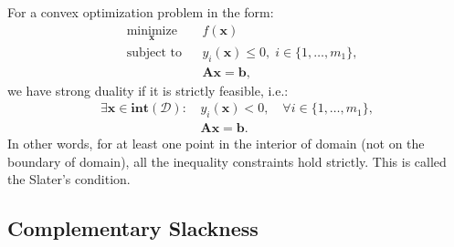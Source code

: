 \documentclass[lang=cn,10pt]{gorgeousnbook}
\numberwithin{equation}{section}%
\numberwithin{figure}{section}%
\begin{document}
\begin{lemma}
For a convex optimization problem in the form: 
\begin{equation}\label{equation_optimization_problem_inequalityConstraints_Ax_equals_b_constraint}
\begin{aligned}
& \underset{\boldsymbol{x}}{\text{minimize}}
& & f(\boldsymbol{x}) \\
& \text{subject to}
& & y_i(\boldsymbol{x}) \leq 0, \; i \in \{1, \ldots, m_1\}, \\
& & & \boldsymbol{Ax} = \boldsymbol{b}, 
\end{aligned}
\end{equation}
we have strong duality if it is strictly feasible, i.e.:
\begin{equation}
\begin{aligned}
\exists \boldsymbol{x} \in \textbf{int}(\mathcal{D}):\, & y_i(\boldsymbol{x}) < 0, \quad \forall i \in \{1, \dots, m_1\}, \\
& \boldsymbol{Ax} = \boldsymbol{b}.
\end{aligned}
\end{equation}
In other words, for at least one point in the interior of domain (not on the boundary of domain), all the inequality constraints hold strictly. This is called the Slater's condition. 
\end{lemma}

\subsection{Complementary Slackness}
\end{document}
